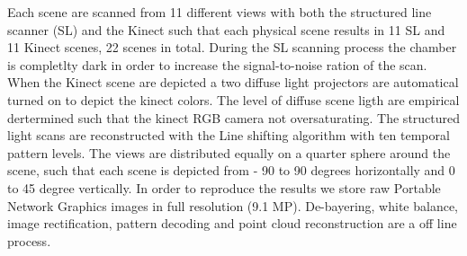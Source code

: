 \documentclass[10pt,twocolumn,letterpaper]{article}
\begin{document}
Each scene are scanned from 11 different views with both the structured line scanner (SL) and the Kinect such that each physical scene results in 11 SL and 11 Kinect scenes, 22 scenes in total. During the SL scanning process the chamber is completlty dark in order to increase the signal-to-noise ration of the scan. When the Kinect scene are depicted a two diffuse light projectors are automatical turned on to depict the kinect colors. The level of diffuse scene ligth are empirical dertermined such that the kinect RGB camera not oversaturating.  The structured light scans are reconstructed with the Line shifting algorithm \cite{Guehring2000} with ten temporal pattern levels. The views are distributed equally on a quarter sphere around the scene, such that each scene is depicted from - 90 to 90 degrees horizontally and 0 to 45 degree vertically. In order to reproduce the results we store raw Portable Network Graphics images in full resolution (9.1 MP). De-bayering, white balance, image rectification, pattern decoding and point cloud reconstruction are a off line process.   


\end{document}
